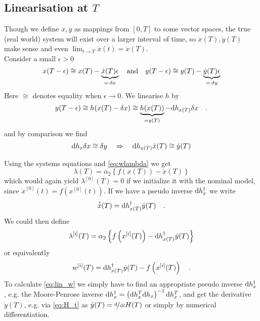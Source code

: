 \clearpage	
\subsection{Linearisation at $T$}
	Though we define $x,y$ as mappings from $[0,T]$ to some vector spaces, the true 
	(real world) system will exist over a larger interval of time, so 
	$\dot{x}(T),\dot{y}(T)$ make sense and even $\lim_{t\to T}\dot{x}(t)=\dot{x}(T)$.\\
	Consider a small $\epsilon > 0$
	\begin{equation}
	x(T-\epsilon) \cong x(T) - \underbrace{\dot{x}(T) \epsilon}_{=:\delta x} 
	\quad \text{and} \quad	
	 y(T-\epsilon) \cong y(T) - \underbrace{\dot{y}(T)\epsilon}_{=:\delta y}
	\label{eq:lin_x}
	\end{equation}
	Here $\cong$ denotes equality when $\epsilon \rightarrow 0$. We linearise $h$ by 
	\begin{equation}
	y(T-\epsilon) \cong h(x(T)-\delta x) \cong \underbrace{h(x(T))}_{=y(T)} - \text{d} 
	h_{x(T)} 
	\delta x \quad .
	\end{equation}
	and by comparison we find
	\begin{equation}
	\text{d} h_x \delta x \cong \delta y \quad\Rightarrow\quad \text{d} h_{x(T)} \dot{x}(T) \cong
	 \dot{y}(T)
	\end{equation}		
	
	Using the systems equations and \eqref{eq:wlambda} we get
	\begin{equation}
	\lambda(T) = \alpha_2 \left\{
	f(x(T))-\dot{x}(T)	
	 \right\}
	\end{equation}
	which would again yield $\lambda^{[0]}(T)=0$ if we initialize it with the nominal 
	model, since $\dot{x}^{[0]}(t)=f(x^{[0]}(t))$. 
	If we have a pseudo inverse	$\text{d} h_x^\dagger$ we write	
	\begin{equation}
	\hat{\dot{x}}(T) = \text{d} h_{x(T)}^\dagger \dot{y}(T) \quad .
	\end{equation}
	We could then define
	\begin{align}
	\lambda^{[i]}(T) = \alpha_2\left\{ f\left(x^{[i]}(T)\right) - \text{d} h_{x(T)}^\dagger 
	\dot{y}
	(T)  \right\}  
	\end{align}
	or equivalently
	\begin{equation}
	w^{[i]}(T) = \text{d} h_{x(T)}^\dagger \dot{y}(T) - f\left( x^{[i]}(T) \right) \quad .
	\label{eq:lin_w}
	\end{equation}
	To calculate \eqref{eq:lin_w} we simply have to find an appropriate pseudo inverse 
	$\text{d} h_x^\dagger$, e.g. the Moore-Penrose inverse $\text{d} h_x^\dagger = \left( \text{d} h_x^T 
	\text{d} h_x\right )^{-1} \text{d} h_x^T $, and get the derivative $\dot{y}(T)$, e.g. 
	via \eqref{eq:H_t} as $\dot{y}(T) = \nicefrac{\text{d}}{\text{d} t}H(T)$ or simply by numerical 
	differentiation.
	
